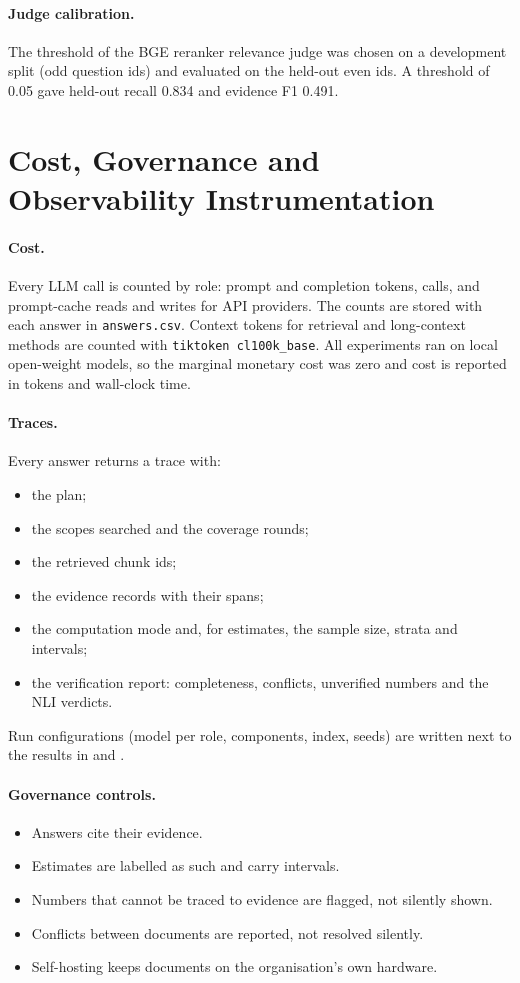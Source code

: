 \documentclass[11pt,letterpaper,oneside]{report}
\begin{document}
\paragraph{Judge calibration.}
The threshold of the BGE reranker relevance judge was chosen on a
development split (odd question ids) and evaluated on the held-out even ids.
A threshold of 0.05 gave held-out recall 0.834 and evidence F1 0.491.

\section{Cost, Governance and Observability Instrumentation}
\label{sec:instrumentation}

\paragraph{Cost.}
Every LLM call is counted by role: prompt and completion tokens, calls, and
prompt-cache reads and writes for API providers. The counts are stored with
each answer in \texttt{answers.csv}. Context tokens for retrieval and
long-context methods are counted with \texttt{tiktoken cl100k\_base}. All
experiments ran on local open-weight models, so the marginal monetary cost
was zero and cost is reported in tokens and wall-clock time.

\paragraph{Traces.}
Every answer returns a trace with:
\begin{itemize}
  \item the plan;
  \item the scopes searched and the coverage rounds;
  \item the retrieved chunk ids;
  \item the evidence records with their spans;
  \item the computation mode and, for estimates, the sample size, strata and
  intervals;
  \item the verification report: completeness, conflicts, unverified numbers
  and the NLI verdicts.
\end{itemize}
Run configurations (model per role, components, index, seeds) are written
next to the results in  and
.

\paragraph{Governance controls.}
\begin{itemize}
  \item Answers cite their evidence.
  \item Estimates are labelled as such and carry intervals.
  \item Numbers that cannot be traced to evidence are flagged, not silently
  shown.
  \item Conflicts between documents are reported, not resolved silently.
  \item Self-hosting keeps documents on the organisation's own hardware.
\end{itemize}
\end{document}
